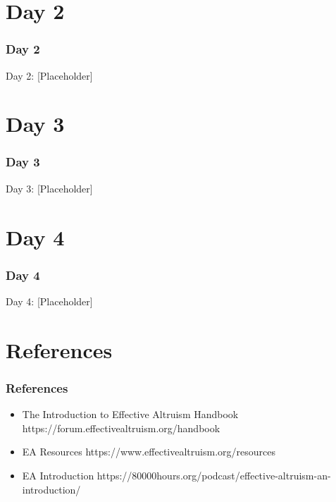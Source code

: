 \section{Day 2}

\begin{frame}[fragile]\frametitle{Day 2}
\begin{center}
{\Large Day 2: [Placeholder]}
\end{center}
\end{frame}

\section{Day 3}

\begin{frame}[fragile]\frametitle{Day 3}
\begin{center}
{\Large Day 3: [Placeholder]}
\end{center}
\end{frame}

\section{Day 4}

\begin{frame}[fragile]\frametitle{Day 4}
\begin{center}
{\Large Day 4: [Placeholder]}
\end{center}
\end{frame}

\section{References}

\begin{frame}[fragile]\frametitle{References}
  \begin{itemize}
    \item The Introduction to Effective Altruism Handbook https://forum.effectivealtruism.org/handbook
	\item EA Resources https://www.effectivealtruism.org/resources
	\item EA Introduction https://80000hours.org/podcast/effective-altruism-an-introduction/
  \end{itemize}

\end{frame}